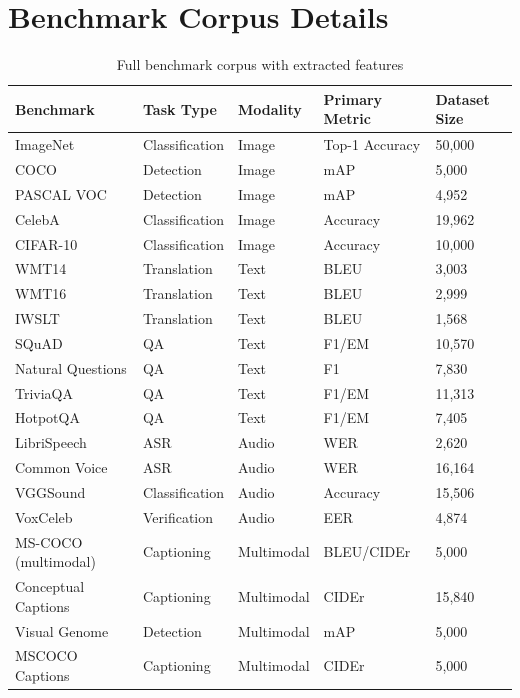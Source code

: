 \appendix

\section{Benchmark Corpus Details}

\begin{table}[h]
\centering
\caption{Full benchmark corpus with extracted features}
\label{tab:benchmark-corpus}
\begin{tabular}{lllll}
\toprule
Benchmark & Task Type & Modality & Primary Metric & Dataset Size \\
\midrule
ImageNet & Classification & Image & Top-1 Accuracy & 50,000 \\
COCO & Detection & Image & mAP & 5,000 \\
PASCAL VOC & Detection & Image & mAP & 4,952 \\
CelebA & Classification & Image & Accuracy & 19,962 \\
CIFAR-10 & Classification & Image & Accuracy & 10,000 \\
WMT14 & Translation & Text & BLEU & 3,003 \\
WMT16 & Translation & Text & BLEU & 2,999 \\
IWSLT & Translation & Text & BLEU & 1,568 \\
SQuAD & QA & Text & F1/EM & 10,570 \\
Natural Questions & QA & Text & F1 & 7,830 \\
TriviaQA & QA & Text & F1/EM & 11,313 \\
HotpotQA & QA & Text & F1/EM & 7,405 \\
LibriSpeech & ASR & Audio & WER & 2,620 \\
Common Voice & ASR & Audio & WER & 16,164 \\
VGGSound & Classification & Audio & Accuracy & 15,506 \\
VoxCeleb & Verification & Audio & EER & 4,874 \\
MS-COCO (multimodal) & Captioning & Multimodal & BLEU/CIDEr & 5,000 \\
Conceptual Captions & Captioning & Multimodal & CIDEr & 15,840 \\
Visual Genome & Detection & Multimodal & mAP & 5,000 \\
MSCOCO Captions & Captioning & Multimodal & CIDEr & 5,000 \\
\bottomrule
\end{tabular}
\end{table}

